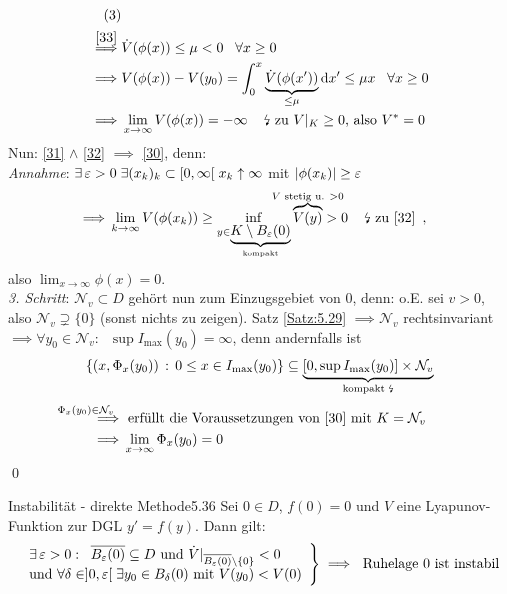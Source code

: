 \documentclass[a4paper]{article}
\begin{document}
\begin{Beweis}
\begin{align*}
{{{}}}\tag{$3$}\label{33}\\
\overset{\eqref{33}}{\implies}& \dot{V}(\phi(x))\le \mu<0\;\;\;\forall x\ge 0\\
\implies& V(\phi(x))-V(y_0)=\int_0^x\underbrace{\dot{V}(\phi(x'))}_{\le \mu}\mathop{}\!\mathrm{d} x'\le\mu x\;\;\;\forall x\ge0\\
\implies& \lim_{x\to\infty} V(\phi(x))=-\infty\;\;\;\text{ \lightning{} zu $V|_K\ge 0$, also $V^*=0$ }
\end{align*}
Nun: \eqref{31} $\wedge$ \eqref{32} $\implies$ \eqref{30}, denn:\\
\textit{Annahme}: $\exists \operatorname{\varepsilon}>0\;\exists(x_k)_k\subset [0,\infty[\;x_k\uparrow\infty$ mit $|\phi(x_k)|\ge \operatorname{\varepsilon}$
\begin{align*}
\implies & \lim_{k\to\infty}V(\phi(x_k))\ge \inf_{y\in\underbrace{K\setminus B_{\ve}(0)}_{\text{kompakt}}}\overbrace{V(y)}^{\ms{V\te{stetig u. }>0}}>0\;\;\;\te{\lightning{} zu \eqref{32} } \,,
\end{align*}
also $\lim_{x\to\infty}\phi(x)=0$.\\
\textit{3. Schritt}: $\mathcal{N}_v\subset D$ gehört nun zum Einzugsgebiet von 0, denn: o.E. sei $v>0$, also $\mathcal{N}_v\supsetneq \{0\}$ (sonst nichts zu zeigen). Satz \ref{Satz:5.29} $\implies \mathcal{N}_v$ rechtsinvariant $\implies \forall y_0\in\mathcal{N}_v:\;\;\sup I_{\max}(y_0)=\infty $, denn andernfalls ist
\[\{(x,\Phi_x(y_0))\,:\,0\le x\in I_{\max}(y_0)\}\subseteq \underbrace{[0,\sup I_{\max}(y_0)]\times \mathcal{N}_v}_{\text{kompakt \lightning}}\]
\begin{align*}
\overset{\hspace{0.3cm}\mathllap{\Phi_x(y_0)\in \mathcal{N}_v}}{\implies}& \te{erfüllt die Voraussetzungen von \eqref{30} mit } K=\mathcal{N}_v\\
\implies & \lim_{x\to\infty}\Phi_x(y_0)=0
\end{align*}\qed
\end{Beweis}

\begin{Satz}{Instabilität - direkte Methode}{5.36}
Sei $0\in D$, $f(0)=0$ und $V$ eine Lyapunov-Funktion zur DGL $y'=f(y)$. Dann gilt:
\[\left.\begin{array}{l}
\displaystyle\exists \operatorname{\varepsilon}>0:\;\;\overline{B_{\operatorname{\varepsilon}}(0)}\subseteq D\text{ und }\dot{V}|_{\overline{B_{\operatorname{\varepsilon}}(0)}\setminus\{0\}}<0\\
\displaystyle\text{und }\forall\delta\in]0,\operatorname{\varepsilon}[\;\exists y_0\in B_{\delta}(0)\text{ mit }V(y_0)<V(0) 
\end{array}\right\}
\implies\text{ Ruhelage 0 ist instabil}\]
\end{Satz}
\end{document}
